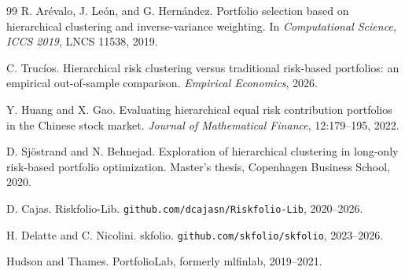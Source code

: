 \documentclass[11pt]{article}
\begin{document}
\begin{thebibliography}{99}
R. Ar\'evalo, J. Le\'on, and G. Hern\'andez.
Portfolio selection based on hierarchical clustering and inverse-variance
weighting.
In \emph{Computational Science, ICCS 2019}, LNCS 11538, 2019.

C. Truc\'ios.
Hierarchical risk clustering versus traditional risk-based portfolios: an
empirical out-of-sample comparison.
\emph{Empirical Economics}, 2026.

Y. Huang and X. Gao.
Evaluating hierarchical equal risk contribution portfolios in the Chinese
stock market.
\emph{Journal of Mathematical Finance}, 12:179--195, 2022.

D. Sj\"ostrand and N. Behnejad.
Exploration of hierarchical clustering in long-only risk-based portfolio
optimization.
Master's thesis, Copenhagen Business School, 2020.

D. Cajas.
Riskfolio-Lib. \texttt{github.com/dcajasn/Riskfolio-Lib}, 2020--2026.

H. Delatte and C. Nicolini.
skfolio. \texttt{github.com/skfolio/skfolio}, 2023--2026.

Hudson and Thames.
PortfolioLab, formerly mlfinlab, 2019--2021.

\end{thebibliography}
\end{document}
